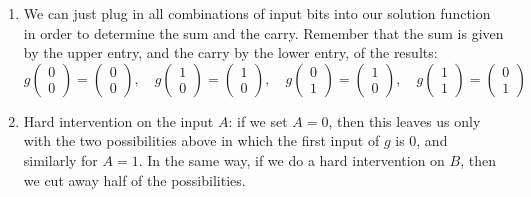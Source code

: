 \begin{enumerate}
\begin{gradedsolution}
\begin{enumerate}
\begin{equation}
    \label{eq:string_of_equations}
  \end{equation}
  which forces the equalities $g_S \begin{pmatrix} a \\ b\end{pmatrix} = a \oplus b$ and $g_C \begin{pmatrix} a \\ b\end{pmatrix} = a \wedge b$. 
  This shows uniqueness, and by construction, this is indeed a valid solution function.
  \item We can just plug in all combinations of input bits into our solution function in order to determine the sum and the carry. Remember that the sum is given by the upper entry, and the carry by the lower entry, of the results:
  \begin{equation}
    g \begin{pmatrix} 0 \\ 0\end{pmatrix} = \begin{pmatrix} 0 \\ 0\end{pmatrix}, \quad 
    g  \begin{pmatrix} 1 \\ 0\end{pmatrix} = \begin{pmatrix} 1 \\ 0\end{pmatrix}, \quad 
    g  \begin{pmatrix} 0 \\ 1\end{pmatrix} = \begin{pmatrix} 1 \\ 0\end{pmatrix}, \quad 
    g \begin{pmatrix} 1 \\ 1\end{pmatrix} = \begin{pmatrix} 0 \\ 1\end{pmatrix}
    \label{eq:sums_and_carries}
  \end{equation}
  \item Hard intervention on the input $A$: if we set $A = 0$, then this leaves us only with the two possibilities above in which the first input of $g$ is $0$, and similarly for $A = 1$.
  In the same way, if we do a hard intervention on $B$, then we cut away half of the possibilities.

\end{enumerate}
\end{gradedsolution}
\end{enumerate}
